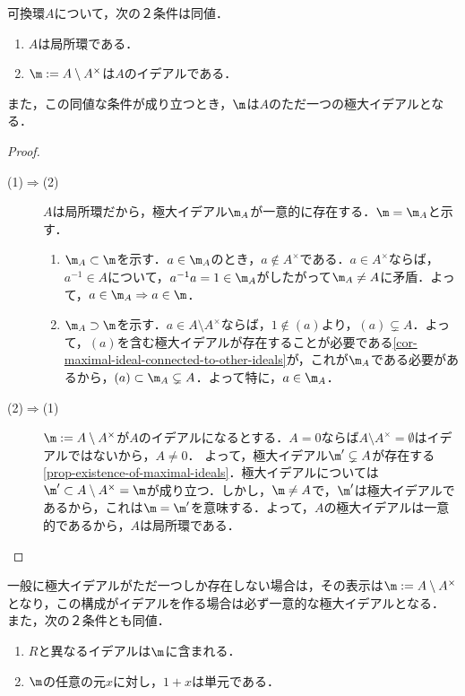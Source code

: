 \documentclass[uplatex,dvipdfmx]{jsreport}
\begin{document}
\begin{proposition}[局所環の特徴付け]
    可換環$A$について，次の２条件は同値．
    \begin{enumerate}
        \item $A$は局所環である．
        \item $\m:=A\setminus A^\times$は$A$のイデアルである．
    \end{enumerate}
    また，この同値な条件が成り立つとき，$\m$は$A$のただ一つの極大イデアルとなる．
\end{proposition}
\begin{proof}\mbox{}
    \begin{description}
        \item[(1)$\Rightarrow$(2)] $A$は局所環だから，極大イデアル$\m_A$が一意的に存在する．$\m=\m_A$と示す． \begin{enumerate}
            \item $\m_A\subset\m$を示す．$a\in\m_A$のとき，$a\notin A^\times$である．$a\in A^\times$ならば，$a^{-1}\in A$について，$a^{-1}a=1\in\m_A$がしたがって$\m_A\ne A$に矛盾．よって，$a\in\m_A\Rightarrow a\in\m$．
            \item $\m_A\supset\m$を示す．$a\in A\setminus A^\times$ならば，$1\notin(a)$より，$(a)\subsetneq A$．よって，$(a)$を含む極大イデアルが存在することが必要である\ref{cor-maximal-ideal-connected-to-other-ideals}が，これが$\m_A$である必要があるから，$(a)\subset\m_A\subsetneq A$．よって特に，$a\in\m_A$．
        \end{enumerate}
        \item[(2)$\Rightarrow$(1)] $\m:=A\setminus A^\times$が$A$のイデアルになるとする．$A=0$ならば$A\setminus A^\times=\emptyset$はイデアルではないから，$A\ne 0$．
        よって，極大イデアル$\m'\subsetneq A$が存在する\ref{prop-existence-of-maximal-ideals}．極大イデアルについては$\m'\subset A\setminus A^\times=\m$が成り立つ．しかし，$\m\ne A$で，$\m'$は極大イデアルであるから，これは$\m=\m'$を意味する．よって，$A$の極大イデアルは一意的であるから，$A$は局所環である．
    \end{description}
\end{proof}
\begin{remarks}
    一般に極大イデアルがただ一つしか存在しない場合は，その表示は$\m:=A\setminus A^\times$となり，この構成がイデアルを作る場合は必ず一意的な極大イデアルとなる．
    また，次の２条件とも同値．
    \begin{enumerate}
        \item $R$と異なるイデアルは$\m$に含まれる．
        \item $\m$の任意の元$x$に対し，$1+x$は単元である．
    \end{enumerate}
\end{remarks}
\end{document}
